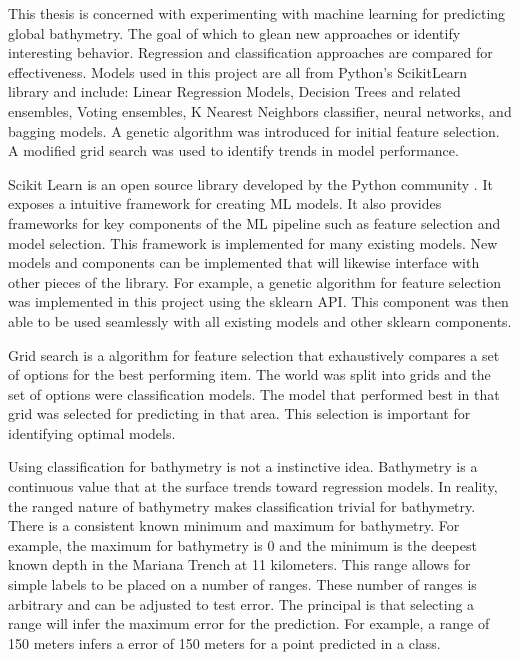 \par
This thesis is concerned with experimenting with machine learning for predicting global bathymetry.
The goal of which to glean new approaches or identify interesting behavior.
Regression and classification approaches are compared for effectiveness.
Models used in this project are all from Python's ScikitLearn library and include: Linear Regression Models, Decision Trees and related ensembles, Voting ensembles, K Nearest Neighbors classifier, neural networks, and bagging models.
A genetic algorithm was introduced for initial feature selection.
A modified grid search was used to identify trends in model performance.

\par
Scikit Learn is an open source library developed by the Python community \cite{scikit-learn}.
It exposes a intuitive framework for creating \ac{ML} models.
It also provides frameworks for key components of the \ac{ML} pipeline such as feature selection and model selection.
This framework is implemented for many existing models.
New models and components can be implemented that will likewise interface with other pieces of the library.
For example, a genetic algorithm for feature selection was implemented in this project using the sklearn \ac{API}.
This component was then able to be used seamlessly with all existing models and other sklearn components.

\par
Grid search is a algorithm for feature selection that exhaustively compares a set of options for the best performing item.
The world was split into grids and the set of options were classification models.
The model that performed best in that grid was selected for predicting in that area.
This selection is important for identifying optimal models.


\par
Using classification for bathymetry is not a instinctive idea.
Bathymetry is a continuous value that at the surface trends toward regression models.
In reality, the ranged nature of bathymetry makes classification trivial for bathymetry.
There is a consistent known minimum and maximum for bathymetry.
For example, the maximum for bathymetry is 0 and the minimum is the deepest known depth in the Mariana Trench at 11 kilometers.
This range allows for simple labels to be placed on a number of ranges.
These number of ranges is arbitrary and can be adjusted to test error.
The principal is that selecting a range will infer the maximum error for the prediction.
For example, a range of 150 meters infers a error of 150 meters for a point predicted in a class.




